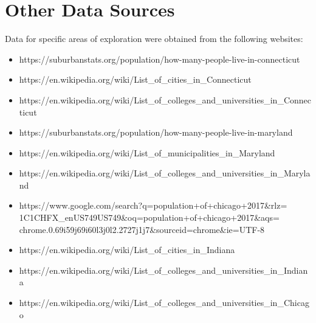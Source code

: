 \documentclass{report}
\begin{document}
\section{Other Data Sources}
\label{Other}
Data for specific areas of exploration were obtained from the following websites:
\begin{itemize}
\item[] https://suburbanstats.org/population/how-many-people-live-in-connecticut
\item[] https://en.wikipedia.org/wiki/List_of_cities_in_Connecticut
\item[] https://en.wikipedia.org/wiki/List_of_colleges_and_universities_in_Connecticut
\item[] https://suburbanstats.org/population/how-many-people-live-in-maryland
\item[] https://en.wikipedia.org/wiki/List_of_municipalities_in_Maryland
\item[] https://en.wikipedia.org/wiki/List_of_colleges_and_universities_in_Maryland
\item[] https://www.google.com/search?q=population+of+chicago+2017\&rlz=\\
1C1CHFX_enUS749US749\&oq=population+of+chicago+2017\&aqs=\\
chrome.0.69i59j69i60l3j0l2.2727j1j7\&sourceid=chrome\&ie=UTF-8
\item[] https://en.wikipedia.org/wiki/List_of_cities_in_Indiana
\item[] https://en.wikipedia.org/wiki/List_of_colleges_and_universities_in_Indiana
\item[] https://en.wikipedia.org/wiki/List_of_colleges_and_universities_in_Chicago
\end{itemize}
\end{document}
